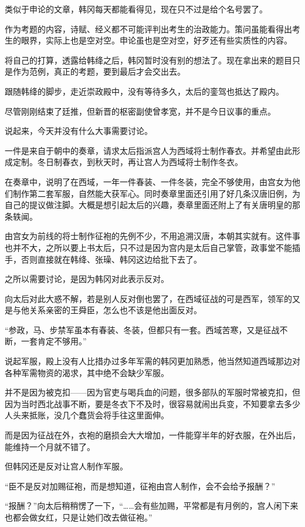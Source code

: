 类似于申论的文章，韩冈每天都能看得见，现在只不过是给个名号罢了。

作为考题的内容，诗赋、经义都不可能评判出考生的治政能力。策问虽能看得出考生的眼界，实际上也是空对空。申论虽也是空对空，好歹还有些实质性的内容。

将自己的打算，透露给韩绛之后，韩冈暂时没有别的想法了。现在拿出来的题目只是作为范例，真正的考题，要到最后才会交出去。

跟随韩绛的脚步，走近崇政殿中，没有等待多久，太后的銮驾也抵达了殿内。

尽管刚刚结束了廷推，但新晋的枢密副使曾孝宽，并不是今日议事的重点。

说起来，今天并没有什么大事需要讨论。

一件是来自于朝中的奏章，请求太后指派宫人为西域将士制作春衣。并希望由此形成定制。冬日制春衣，到秋天时，再让宫人为西域将士制作冬衣。

在奏章中，说明了在西域，一年一件春装、一件冬装，完全不够使用，由宫女为他们制作第二套军服，自然能大获军心。同时奏章里面还引用了好几条汉唐旧例，为自己的提议做注脚。大概是想引起太后的兴趣，奏章里面还附上了有关唐明皇的那条轶闻。

由宫女为前线的将士制作征袍的先例不少，不用追溯汉唐，本朝其实就有。这件事也并不大，之所以要上书太后，只不过是因为宫内是太后自己掌管，政事堂不能插手，否则直接就在韩绛、张璪、韩冈这边给批下去了。

之所以需要讨论，是因为韩冈对此表示反对。

向太后对此大惑不解，若是别人反对倒也罢了，在西域征战的可是西军，领军的又是与他关系亲密的王舜臣，怎么也不该是他出面反对。

“参政，马、步禁军虽本有春装、冬装，但都只有一套。西域苦寒，又是征战不断，一套肯定不够用。”

说起军服，殿上没有人比措办过多年军需的韩冈更加熟悉，他当然知道西域那边对各种军需物资的渴求，其中绝不会缺少军服。

并不是因为被克扣——因为官吏与喝兵血的问题，很多部队的军服时常被克扣，但因为当时西北战事不断，要是冬衣下不及时，很容易就闹出兵变，不知要拿去多少人头来抵账，没几个蠢货会将手往这里面伸。

而是因为征战在外，衣袍的磨损会大大增加，一件能穿半年的好衣服，在外出后，能维持一个月就不错了。

但韩冈还是反对让宫人制作军服。

“臣不是反对加赐征袍，而是想知道，征袍由宫人制作，会不会给予报酬？”

“报酬？”向太后稍稍愣了一下，“……会有些加赐，平常都是有月例的，宫人闲下来也都会做女红，只是让她们改去做征袍。”

